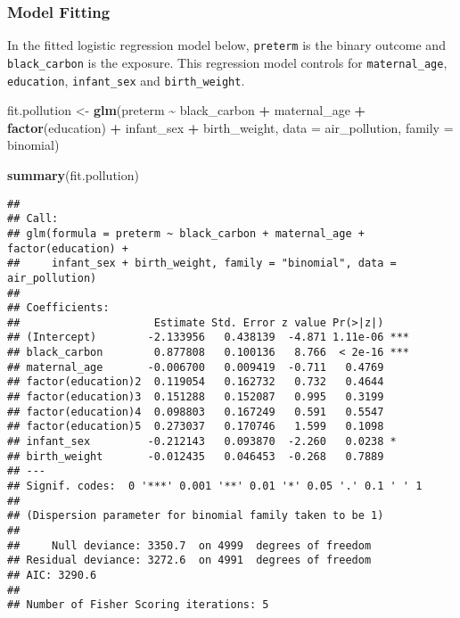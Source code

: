 \documentclass[
]{article}
\newenvironment{Shaded}{\begin{snugshade}}{\end{snugshade}}
\newcommand{\AttributeTok}[1]{\textcolor[rgb]{0.13,0.29,0.53}{#1}}
\newcommand{\FunctionTok}[1]{\textcolor[rgb]{0.13,0.29,0.53}{\textbf{#1}}}
\newcommand{\NormalTok}[1]{#1}
\newcommand{\OtherTok}[1]{\textcolor[rgb]{0.56,0.35,0.01}{#1}}
\newcommand{\SpecialCharTok}[1]{\textcolor[rgb]{0.81,0.36,0.00}{\textbf{#1}}}
\newcommand{\StringTok}[1]{\textcolor[rgb]{0.31,0.60,0.02}{#1}}
\begin{document}
\subsubsection{Model Fitting}\label{model-fitting}

In the fitted logistic regression model below, \texttt{preterm} is the
binary outcome and \texttt{black\_carbon} is the exposure. This
regression model controls for \texttt{maternal\_age},
\texttt{education}, \texttt{infant\_sex} and \texttt{birth\_weight}.

\begin{Shaded}
\begin{Highlighting}[]
\NormalTok{fit.pollution }\OtherTok{\textless{}{-}} \FunctionTok{glm}\NormalTok{(preterm }\SpecialCharTok{\textasciitilde{}}\NormalTok{ black\_carbon }\SpecialCharTok{+}\NormalTok{ maternal\_age }\SpecialCharTok{+} \FunctionTok{factor}\NormalTok{(education) }\SpecialCharTok{+}\NormalTok{ infant\_sex }\SpecialCharTok{+}\NormalTok{ birth\_weight, }\AttributeTok{data =}\NormalTok{ air\_pollution, }\AttributeTok{family =} \StringTok{\textquotesingle{}binomial\textquotesingle{}}\NormalTok{)}

\FunctionTok{summary}\NormalTok{(fit.pollution)}
\end{Highlighting}
\end{Shaded}

\begin{verbatim}
## 
## Call:
## glm(formula = preterm ~ black_carbon + maternal_age + factor(education) + 
##     infant_sex + birth_weight, family = "binomial", data = air_pollution)
## 
## Coefficients:
##                     Estimate Std. Error z value Pr(>|z|)    
## (Intercept)        -2.133956   0.438139  -4.871 1.11e-06 ***
## black_carbon        0.877808   0.100136   8.766  < 2e-16 ***
## maternal_age       -0.006700   0.009419  -0.711   0.4769    
## factor(education)2  0.119054   0.162732   0.732   0.4644    
## factor(education)3  0.151288   0.152087   0.995   0.3199    
## factor(education)4  0.098803   0.167249   0.591   0.5547    
## factor(education)5  0.273037   0.170746   1.599   0.1098    
## infant_sex         -0.212143   0.093870  -2.260   0.0238 *  
## birth_weight       -0.012435   0.046453  -0.268   0.7889    
## ---
## Signif. codes:  0 '***' 0.001 '**' 0.01 '*' 0.05 '.' 0.1 ' ' 1
## 
## (Dispersion parameter for binomial family taken to be 1)
## 
##     Null deviance: 3350.7  on 4999  degrees of freedom
## Residual deviance: 3272.6  on 4991  degrees of freedom
## AIC: 3290.6
## 
## Number of Fisher Scoring iterations: 5
\end{verbatim}
\end{document}
